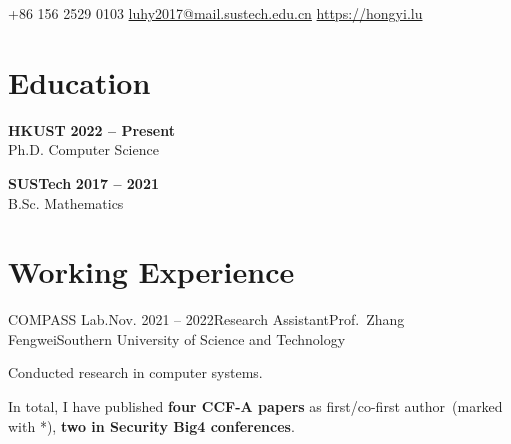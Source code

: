 \documentclass{resume}
\begin{document}
\begin{center}
	\contact
	{+86 156 2529 0103}
	{\href{mailto://luhy2017@mail.sustech.edu.cn}{luhy2017@mail.sustech.edu.cn}}
	{\href{https://hongyi.lu}{https://hongyi.lu}}
\end{center}

\section{Education}
\begin{content}
	{\bf HKUST}
	\hfill {\bf 2022
		-- Present}
	\\ {Ph.D. Computer Science}

	{\bf SUSTech} \hfill {\bf 2017 --
		2021} \\
	{B.Sc. Mathematics} \hfill

	\sectionlineskip
\end{content}

\section{Working Experience}
\begin{content}

	\begin{position}{COMPASS Lab.}{Nov. 2021 -- 2022}{Research
			Assistant}{Prof.~Zhang Fengwei}{Southern University of Science and
			Technology}
		\item Conducted research in computer systems.
	\end{position}

	\sectionlineskip
\end{content}
\vspace{-3\medskipamount}

\noindent
\renewcommand{\refname}{Publications}   %
\nocite{*}
\sectionlineskip

In total, I have published \textbf{four CCF-A papers} as first/co-first author~(marked with *), \textbf{two in Security Big4 conferences}.
\end{document}
